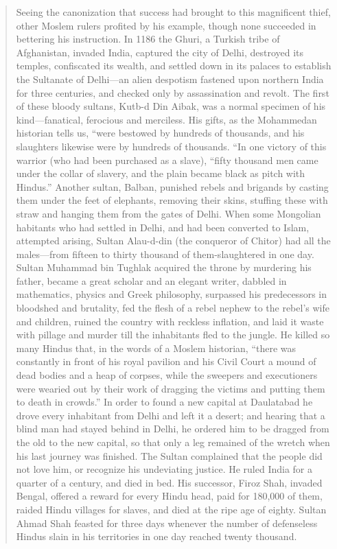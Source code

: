 \begin{quotation}
\indent
Seeing the canonization that success had brought to this magnificent thief, other Moslem rulers profited by his example, though none succeeded in bettering his instruction. In 1186 the Ghuri, a Turkish tribe of Afghanistan, invaded India, captured the city of Delhi, destroyed its temples, confiscated its wealth, and settled down in its palaces to establish the Sultanate of Delhi—an alien despotism fastened upon northern India for three centuries, and checked only by assassination and revolt. The first of these bloody sultans, Kutb-d Din Aibak, was a normal specimen of his kind—fanatical, ferocious and merciless. His gifts, as the Mohammedan historian tells us, “were bestowed by hundreds of thousands, and his slaughters likewise were by hundreds of thousands. “In one victory of this warrior (who had been purchased as a slave), “fifty thousand men came under the collar of slavery, and the plain became black as pitch with Hindus.” Another sultan, Balban, punished rebels and brigands by casting them under the feet of elephants, removing their skins, stuffing these with straw and hanging them from the gates of Delhi. When some Mongolian habitants who had settled in Delhi, and had been converted to Islam, attempted arising, Sultan Alau-d-din (the conqueror of Chitor) had all the males—from fifteen to thirty thousand of them-slaughtered in one day. Sultan Muhammad bin Tughlak acquired the throne by murdering his father, became a great scholar and an elegant writer, dabbled in mathematics, physics and Greek philosophy, surpassed his predecessors in bloodshed and brutality, fed the flesh of a rebel nephew to the rebel’s wife and children, ruined the country with reckless inflation, and laid it waste with pillage and murder till the inhabitants fled to the jungle. He killed so many Hindus that, in the words of a Moslem historian, “there was constantly in front of his royal pavilion and his Civil Court a mound of dead bodies and a heap of corpses, while the sweepers and executioners were wearied out by their work of dragging the victims and putting them to death in crowds.” In order to found a new capital at Daulatabad he drove every inhabitant from Delhi and left it a desert; and hearing that a blind man had stayed behind in Delhi, he ordered him to be dragged from the old to the new capital, so that only a leg remained of the wretch when his last journey was finished. The Sultan complained that the people did not love him, or recognize his undeviating justice. He ruled India for a quarter of a century, and died in bed. His successor, Firoz Shah, invaded Bengal, offered a reward for every Hindu head, paid for 180,000 of them, raided Hindu villages for slaves, and died at the ripe age of eighty. Sultan Ahmad Shah feasted for three days whenever the number of defenseless Hindus slain in his territories in one day reached twenty thousand.
\medskip


\end{quotation}
